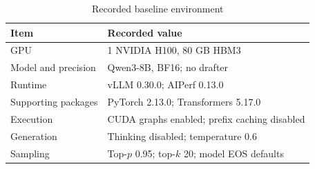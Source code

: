 \begin{table}[htbp]
\centering
\caption{Recorded baseline environment}
\label{tab:environment}
\begin{singlespace}
\small
\setlength{\tabcolsep}{4pt}
\renewcommand{\arraystretch}{1.2}
\begin{tabular}{@{}lp{10cm}@{}}
\toprule
Item & Recorded value \\
\midrule
GPU & 1 NVIDIA H100, 80 GB HBM3 \\
Model and precision & Qwen3-8B, BF16; no drafter \\
Runtime & vLLM 0.30.0; AIPerf 0.13.0 \\
Supporting packages & PyTorch 2.13.0; Transformers 5.17.0 \\
Execution & CUDA graphs enabled; prefix caching disabled \\
Generation & Thinking disabled; temperature 0.6 \\
Sampling & Top-$p$ 0.95; top-$k$ 20; model EOS defaults \\
\bottomrule
\end{tabular}

\end{singlespace}
\end{table}
